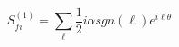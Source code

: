\begin{equation}
S_{fi}^{(1)} = \sum_{\ell} \frac{1}{2} i \alpha sgn(\ell)
e^{i\ell\theta}
\end{equation}

